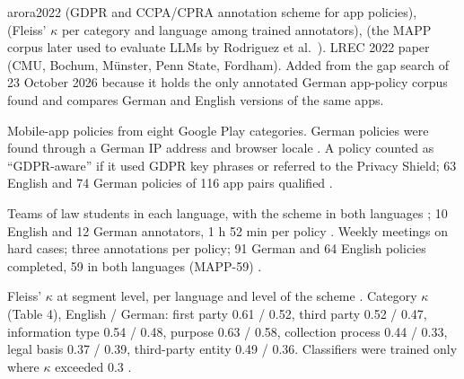 \begin{papercard}{arora2022}
  (GDPR and CCPA/CPRA annotation scheme for app policies),  (Fleiss' $\kappa$ per category and language among trained annotators),  (the MAPP corpus later used to evaluate LLMs by Rodriguez et al.\ ). LREC 2022 paper (CMU, Bochum, Münster, Penn State, Fordham). Added from the gap search of 23 October 2026 because it holds the only annotated German app-policy corpus found and compares German and English versions of the same apps.

 Mobile-app policies from eight Google Play categories. German policies were found through a German IP address and browser locale . A policy counted as ``GDPR-aware'' if it used GDPR key phrases or referred to the Privacy Shield; 63 English and 74 German policies of 116 app pairs qualified .

 Teams of law students in each language, with the scheme in both languages ; 10 English and 12 German annotators, 1 h 52 min per policy . Weekly meetings on hard cases; three annotations per policy; 91 German and 64 English policies completed, 59 in both languages (MAPP-59) .

 Fleiss' $\kappa$ at segment level, per language and level of the scheme . Category $\kappa$ (Table 4), English / German: first party 0.61 / 0.52, third party 0.52 / 0.47, information type 0.54 / 0.48, purpose 0.63 / 0.58, collection process 0.44 / 0.33, legal basis 0.37 / 0.39, third-party entity 0.49 / 0.36. Classifiers were trained only where $\kappa$ exceeded 0.3 .


\end{papercard}
